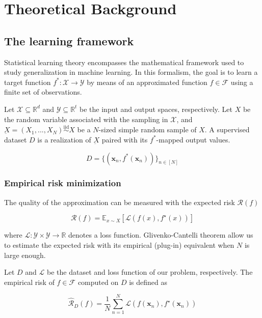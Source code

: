 \chapter{Theoretical Background }\label{sec:theory}

\section{The learning framework}

Statistical learning theory encompasses the mathematical framework used to
study generalization in machine learning. In this formalism, the goal
is to learn a target function $f^*: \mathcal{X} \to \mathcal{Y}$ by means of an approximated
function $f \in \mathcal{F}$ using a finite set of observations. 

\begin{definition}
    Let $\mathcal{X} \subseteq \mathbb{R}^d$ and $\mathcal{Y} \subseteq \mathbb{R}^t$ be
    the input and output spaces, respectively. Let $X$ be the random variable associated
    with the sampling in $\mathcal{X}$, and $\underbar{X} = (X_1, ..., X_N) \overset{\text{iid}}{\sim} X$ be a $N$-sized simple
    random sample of $X$. A supervised dataset $D$ is a realization of $\underbar{X}$ paired with its $f^*$-mapped output values.

    $$
    D = \{(\bm{x}_n, f^*(\bm{x}_n))\}_{n \in [N]}
    $$
\end{definition}

\subsection{Empirical risk minimization}

The quality of the approximation can be measured with the expected risk $\mathcal{R}(f)$

$$
\mathcal{R}(f)=\mathbb{E}_{x \sim X}[\mathcal{L}(f(x),f^\star(x))]
$$

where $\mathcal{L}: \mathcal{Y} \times \mathcal{Y} \to \mathbb{R}$ denotes a loss function. Glivenko-Cantelli theorem allow us to
estimate the expected risk with its empirical (plug-in) equivalent when $N$ is large enough.

\begin{definition} Let $D$ and $\mathcal{L}$ be the dataset and loss function of our problem, respectively. The empirical risk of $f \in \mathcal{F}$
    computed on $D$ is defined as

    $$
    \hat{\mathcal{R}}_D(f)=\frac{1}{N}\sum_{n=1}^{N}\mathcal{L}(f(\bm{x}_{n}),f^{\star}(\bm{x}_{n}))
    $$
\end{definition}

